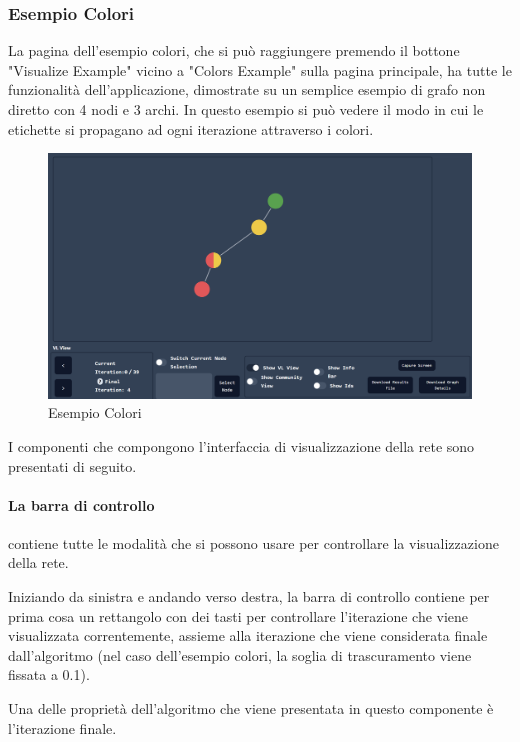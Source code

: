 \documentclass[a4paper,12pt]{report}
\begin{document}
			\pagebreak

			\subsubsection{Esempio Colori}

			La pagina dell'esempio colori, che si può raggiungere premendo il bottone "Visualize Example" vicino a "Colors Example" sulla pagina principale, ha tutte le funzionalità dell'applicazione, dimostrate su un semplice esempio di grafo non diretto con 4 nodi e 3 archi. In questo esempio si può vedere il modo in cui le etichette si propagano ad ogni iterazione attraverso i colori. 


			\begin{center}
			\begin{figure}[H]
			\centering
			\includegraphics[width=0.9\linewidth,keepaspectratio]{colorsexample}	
			\caption{Esempio Colori}
			\end{figure}
			\end{center}
			I componenti che compongono l'interfaccia di visualizzazione della rete sono presentati di seguito.

			\paragraph*{La barra di controllo} contiene tutte le modalità che si possono usare per controllare la visualizzazione della rete. 

			Iniziando da sinistra e andando verso destra, la barra di controllo contiene per prima cosa un rettangolo con dei tasti per controllare l'iterazione che viene visualizzata correntemente, assieme alla iterazione che viene considerata finale dall'algoritmo (nel caso dell'esempio colori, la soglia di trascuramento viene fissata a 0.1). 
			
			Una delle proprietà dell'algoritmo che viene presentata in questo componente è l'iterazione finale.
			
\end{document}
